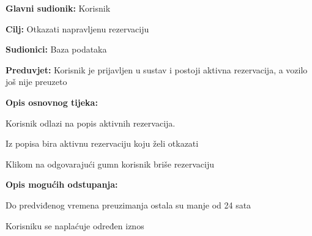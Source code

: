 					\noindent {}
					\begin{packed_item}
	
						\item \textbf{Glavni sudionik: }Korisnik
						\item  \textbf{Cilj: }Otkazati napravljenu rezervaciju
						\item  \textbf{Sudionici: }Baza podataka
						\item  \textbf{Preduvjet: }Korisnik je prijavljen u sustav i postoji aktivna rezervacija, a vozilo još nije preuzeto
						\item  \textbf{Opis osnovnog tijeka:}
						
						\item[] \begin{packed_enum}
							\item Korisnik odlazi na popis aktivnih rezervacija.
							\item Iz popisa bira aktivnu rezervaciju koju želi otkazati
							\item Klikom na odgovarajući gumn korisnik briše rezervaciju
						\end{packed_enum}
						
						\item  \textbf{Opis mogućih odstupanja: }
						
						\item[] \begin{packed_item}
	
							\item[3.a] Do predviđenog vremena preuzimanja ostala su manje od 24 sata 
							\item[] \begin{packed_enum}
								\item Korisniku se naplaćuje određen iznos
							\end{packed_enum}
						\end{packed_item}
					\end{packed_item}
					
